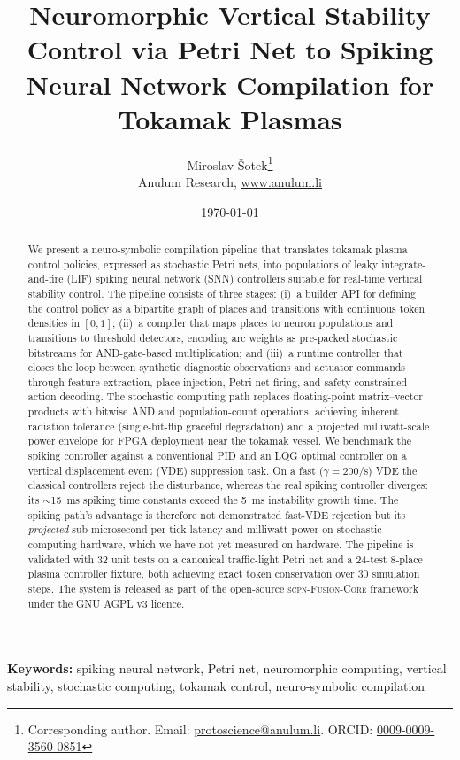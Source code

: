 \documentclass[12pt]{article}
\title{Neuromorphic Vertical Stability Control via Petri Net to Spiking
       Neural Network Compilation for Tokamak Plasmas}
\author{
  Miroslav \v{S}otek\thanks{Corresponding author. Email:
  \href{mailto:protoscience@anulum.li}{protoscience@anulum.li}.
  ORCID: \href{https://orcid.org/0009-0009-3560-0851}{0009-0009-3560-0851}} \\[4pt]
  Anulum Research, \url{www.anulum.li}
}
\date{\today}
\newcommand{\scpn}{\textsc{scpn-Fusion-Core}}
\begin{document}
\maketitle

\begin{abstract}
We present a neuro-symbolic compilation pipeline that translates tokamak
plasma control policies, expressed as stochastic Petri nets, into
populations of leaky integrate-and-fire (LIF) spiking neural network
(SNN) controllers suitable for real-time vertical stability control.
The pipeline consists of three stages: (i)~a builder API for defining
the control policy as a bipartite graph of places and transitions with
continuous token densities in $[0,1]$; (ii)~a compiler that maps places
to neuron populations and transitions to threshold detectors, encoding
arc weights as pre-packed stochastic bitstreams for AND-gate-based
multiplication; and (iii)~a runtime controller that closes the loop
between synthetic diagnostic observations and actuator commands through
feature extraction, place injection, Petri net firing, and
safety-constrained action decoding.  The stochastic computing path
replaces floating-point matrix--vector products with bitwise AND and
population-count operations, achieving inherent radiation tolerance
(single-bit-flip graceful degradation) and a projected milliwatt-scale
power envelope for FPGA deployment near the tokamak vessel.  We benchmark the
spiking controller against a conventional PID and an LQG optimal controller on
a vertical displacement event (VDE) suppression task.  On a fast
($\gamma = 200$/s) VDE the classical controllers reject the disturbance,
whereas the real spiking controller diverges: its $\sim$\SI{15}{\milli\second}
spiking time constants exceed the \SI{5}{\milli\second} instability growth time.
The spiking path's advantage is therefore not demonstrated fast-VDE rejection
but its \emph{projected} sub-microsecond per-tick latency and milliwatt power on
stochastic-computing hardware, which we have not yet measured on hardware.  The
pipeline is
validated with 32 unit tests on a canonical traffic-light Petri net and
a 24-test 8-place plasma controller fixture, both achieving exact token
conservation over 30 simulation steps.  The system is released as part
of the open-source \scpn{} framework under the GNU AGPL v3 licence.
\end{abstract}

\noindent\textbf{Keywords:}
spiking neural network,
Petri net,
neuromorphic computing,
vertical stability,
stochastic computing,
tokamak control,
neuro-symbolic compilation
\end{document}
